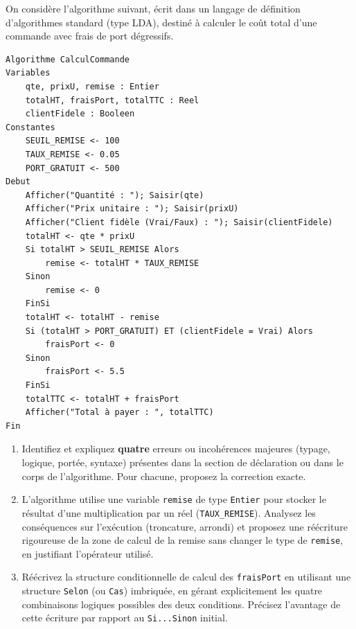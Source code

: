 \documentclass[11pt]{article}
\begin{document}
\begin{exercice}
On considère l'algorithme suivant, écrit dans un langage de définition d'algorithmes standard (type LDA), destiné à calculer le coût total d'une commande avec frais de port dégressifs.

\begin{verbatim}
Algorithme CalculCommande
Variables
    qte, prixU, remise : Entier
    totalHT, fraisPort, totalTTC : Reel
    clientFidele : Booleen
Constantes
    SEUIL_REMISE <- 100
    TAUX_REMISE <- 0.05
    PORT_GRATUIT <- 500
Debut
    Afficher("Quantité : "); Saisir(qte)
    Afficher("Prix unitaire : "); Saisir(prixU)
    Afficher("Client fidèle (Vrai/Faux) : "); Saisir(clientFidele)
    totalHT <- qte * prixU
    Si totalHT > SEUIL_REMISE Alors
        remise <- totalHT * TAUX_REMISE
    Sinon
        remise <- 0
    FinSi
    totalHT <- totalHT - remise
    Si (totalHT > PORT_GRATUIT) ET (clientFidele = Vrai) Alors
        fraisPort <- 0
    Sinon
        fraisPort <- 5.5
    FinSi
    totalTTC <- totalHT + fraisPort
    Afficher("Total à payer : ", totalTTC)
Fin
\end{verbatim}

\begin{enumerate}
    \item Identifiez et expliquez \textbf{quatre} erreurs ou incohérences majeures (typage, logique, portée, syntaxe) présentes dans la section de déclaration ou dans le corps de l'algorithme. Pour chacune, proposez la correction exacte.
    \item L'algorithme utilise une variable \texttt{remise} de type \texttt{Entier} pour stocker le résultat d'une multiplication par un réel (\texttt{TAUX\_REMISE}). Analysez les conséquences sur l'exécution (troncature, arrondi) et proposez une réécriture rigoureuse de la zone de calcul de la remise sans changer le type de \texttt{remise}, en justifiant l'opérateur utilisé.
    \item Réécrivez la structure conditionnelle de calcul des \texttt{fraisPort} en utilisant une structure \texttt{Selon} (ou \texttt{Cas}) imbriquée, en gérant explicitement les quatre combinaisons logiques possibles des deux conditions. Précisez l'avantage de cette écriture par rapport au \texttt{Si...Sinon} initial.
\end{enumerate}
\end{exercice}
\end{document}

